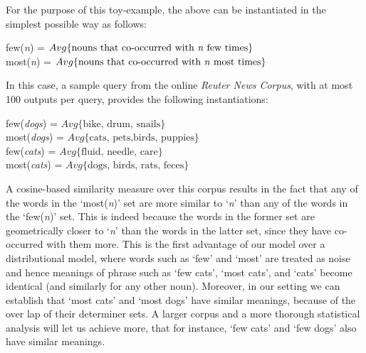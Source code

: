 \documentclass[a4paper,11pt]{easychair}
\begin{document}
For the purpose of this toy-example, the above can be instantiated in the simplest possible way as follows:
\begin{center}
few(\emph{n}) = $Avg\{\mbox{nouns that co-occurred with  \emph{n} few times}\}$\\
most(\emph{n}) = $Avg\{\mbox{nouns that co-occurred with \emph{n} most times}\}$
\end{center}
In this case, a sample query from the online  \emph{Reuter News Corpus}, with at most 100 outputs per query,  provides the following instantiations:
\begin{center}
few(\emph{dogs}) = $Avg\{\mbox{bike, drum, snails}\}$\\
most(\emph{dogs}) = $Avg\{\mbox{cats, pets,birds, puppies}\}$\\
few(\emph{cats}) = $Avg\{\mbox{fluid, needle, care}\}$\\
most(\emph{cats}) = $Avg\{\mbox{dogs, birds, rats, feces}\}$\\
\end{center}
A cosine-based similarity measure over this corpus results in the fact that any of the words in the `most(\emph{n})' set are   more similar to `\emph{n}' than any of  the  words in the `few(\emph{n})' set. This is indeed because  the words in the former set are geometrically closer to `\emph{n}' than the words in the latter set, since they have co-occurred with them more.  This is the first advantage of our model over  a distributional model, where words such as `few' and `most' are treated as  {noise} and hence meanings of phrase such as `few cats', `most cats', and `cats'  become  identical (and similarly for any other noun). Moreover, in our setting we can establish that `most cats' and `most dogs' have similar meanings, because of the over lap of their determiner sets. A larger corpus and a more thorough statistical analysis  will let us achieve more,  that for instance,   `few cats' and `few dogs' also have similar meanings. 
\end{document}
